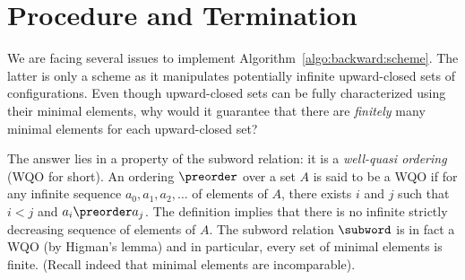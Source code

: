 \section{Procedure and Termination}
\label{section:backward:procedure}
\label{section:backward:termination}

We are facing several issues to implement
Algorithm~\ref{algo:backward:scheme}.
%
The latter is only a scheme as it manipulates potentially infinite
upward-closed sets of configurations.
%
Even though upward-closed sets can be fully characterized using their
minimal elements, why would it guarantee that there are
\emph{finitely} many minimal elements for each upward-closed set?

%
%
%
The answer lies in a property of the subword relation: it is a
\emph{well-quasi ordering} (WQO for short). %
An ordering $\preorder$ over a set $A$ is said to be a WQO if for any
infinite sequence $a_0, a_1, a_2, \ldots$ of elements of $A$, there
exists $i$ and $j$ such that $i<j$ and $a_i\preorder a_j$. 
%
The definition implies that there is no infinite strictly decreasing
sequence of elements of $A$.
%
The subword relation $\subword$ is in fact a WQO %
(by Higman's lemma) %
and in particular, every set of minimal elements is finite. (Recall
indeed that minimal elements are incomparable).
%



